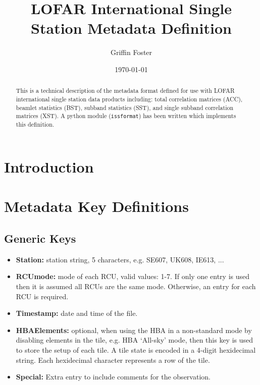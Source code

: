 \documentclass[10pt,a4paper]{article}
\begin{document}
\title{LOFAR International Single Station Metadata Definition}
\author{Griffin Foster}
\date{\today}
\maketitle

\begin{abstract}
This is a technical description of the metadata format defined for use with
LOFAR international single station data products including: total correlation
matrices (ACC), beamlet statistics (BST), subband statistics (SST), and single
subband correlation matrices (XST). A python module (\texttt{issformat}) has
been written which implements this definition.
\end{abstract}

\section{Introduction}
\label{sec:intro}

\section{Metadata Key Definitions}

\subsection{Generic Keys}

\begin{itemize}
    \item \textbf{Station:} station string, 5 characters, e.g. SE607, UK608,
    IE613, ...
    \item \textbf{RCUmode:} mode of each RCU, valid values: 1-7. If only one
    entry is used then it is assumed all RCUs are the same mode. Otherwise, an
    entry for each RCU is required.
    \item \textbf{Timestamp:} date and time of the file.
    \item \textbf{HBAElements:} optional, when using the HBA in a non-standard
    mode by disabling elements in the tile, e.g. HBA `All-sky' mode, then this
    key is used to store the setup of each tile. A tile state is encoded in a
    4-digit hexidecimal string. Each hexidecimal character represents a row of
    the tile.
    \item \textbf{Special:} Extra entry to include comments for the observation.
\end{itemize}
\end{document}
